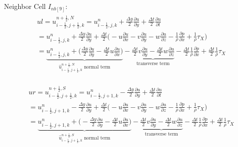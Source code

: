 \documentclass{article}
\numberwithin{equation}{subsection}
\begin{document}
Neighbor Cell $I_{nb[9]}$:
\begin{align}
\begin{split}
& ul = u_{i-\frac{1}{2},j+\frac{1}{2},k}^{n+\frac{1}{2},N} = u_{i-\frac{1}{2},j,k}^n + \frac{\Delta y}{2}\frac{\partial u}{\partial y} + \frac{\Delta t}{2}\frac{\partial u}{\partial t} \\
&= u_{i-\frac{1}{2},j,k}^n + \frac{\Delta y}{2} \frac{\partial u}{\partial y} + \frac{\Delta t}{2} \Big( -u\frac{\partial u}{\partial x} -v\frac{\partial u}{\partial y} -w\frac{\partial u}{\partial z} - \frac{1}{\rho}\frac{\partial p}{\partial x} +\frac{1}{\rho}\tau_X\Big) \\
&= \underbrace{u_{i-\frac{1}{2},j,k}^n + \Big(\frac{\Delta y}{2}\frac{\partial u}{\partial y} - \frac{\Delta t}{2} u\frac{\partial u}{\partial x}\Big)}_\text{$\widehat{u}_{i-\frac{1}{2},j+\frac{1}{2},k}^{n+\frac{1}{2},N}$ normal term} -\underbrace{\frac{\Delta t}{2}v\frac{\partial u}{\partial y} - \frac{\Delta t}{2}w\frac{\partial u}{\partial z}}_\text{transverse term} - \frac{\Delta t}{2}\frac{1}{\rho}\frac{\partial p}{\partial x} + \frac{\Delta t}{2}\frac{1}{\rho}\tau_X
\end{split}
\end{align}

\begin{align}
\begin{split}
& ur = u_{i-\frac{1}{2},j+\frac{1}{2},k}^{n+\frac{1}{2},S} = u_{i-\frac{1}{2},j+1,k}^n - \frac{\Delta y}{2}\frac{\partial u}{\partial y} + \frac{\Delta t}{2}\frac{\partial u}{\partial t} \\
&= u_{i-\frac{1}{2},j+1,k}^n - \frac{\Delta y}{2} \frac{\partial u}{\partial y} + \frac{\Delta t}{2} \Big( -u\frac{\partial u}{\partial x} -v\frac{\partial u}{\partial y} -w\frac{\partial u}{\partial z} - \frac{1}{\rho}\frac{\partial p}{\partial x} +\frac{1}{\rho}\tau_X\Big) \\
&= \underbrace{u_{i-\frac{1}{2},j+1,k}^n + \Big(-\frac{\Delta y}{2}\frac{\partial u}{\partial y} - \frac{\Delta t}{2} u\frac{\partial u}{\partial x}\Big)}_\text{$\widehat{u}_{i-\frac{1}{2},j+\frac{1}{2},k}^{n+\frac{1}{2},S}$ normal term} -\underbrace{\frac{\Delta t}{2}v\frac{\partial u}{\partial y} - \frac{\Delta t}{2}w\frac{\partial u}{\partial z}}_\text{transverse term} - \frac{\Delta t}{2}\frac{1}{\rho}\frac{\partial p}{\partial x} + \frac{\Delta t}{2}\frac{1}{\rho}\tau_X
\end{split}
\end{align}
\end{document}
